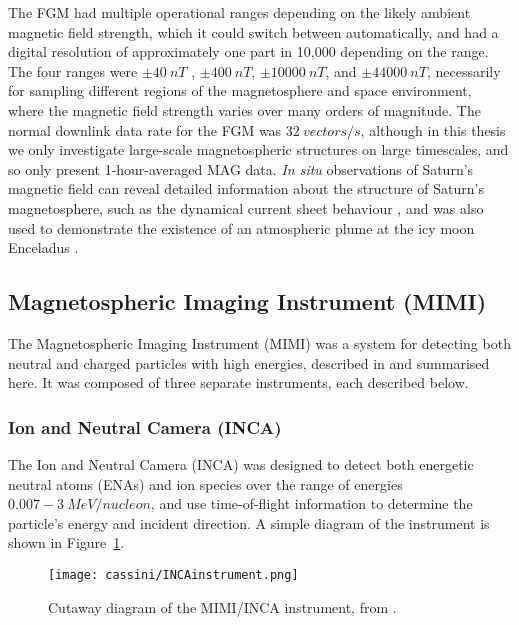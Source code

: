 The FGM had multiple operational ranges depending on the likely ambient magnetic field strength, which it could switch between automatically, and had a digital resolution of approximately one part in 10,000 depending on the range. The four ranges were $\pm\SI{40}{nT}$ , $\pm\SI{400}{nT}$, $\pm\SI{10000}{nT}$, and $\pm\SI{44000}{nT}$, necessarily for sampling different regions of the magnetosphere and space environment, where the magnetic  field strength  varies over many orders of magnitude. The normal downlink data rate for the FGM was $\SI{32}{vectors/s}$, although in this thesis we only investigate large-scale magnetospheric structures on large timescales, and so only present 1-hour-averaged MAG data. \textit{In situ} observations of Saturn's magnetic field can reveal detailed information about the structure of Saturn's magnetosphere, such as the dynamical current sheet behaviour \citep[e.g.][]{provan2012}, and was also used to demonstrate the existence of an atmospheric plume at the icy moon Enceladus \citep{dougherty2006}.

\subsection{Magnetospheric Imaging Instrument (MIMI)}
The Magnetospheric Imaging Instrument (MIMI) was a system for detecting both neutral and charged particles with high energies, described in \citet{krimigis2004} and summarised here. It was composed of three separate instruments, each described below.
\subsubsection{Ion and Neutral Camera (INCA)}
The Ion and Neutral Camera (INCA) was designed to detect both energetic neutral atoms (ENAs) and ion species over the range of energies $0.007-\SI{3}{MeV/nucleon}$, and use time-of-flight information to determine the particle's energy and incident direction. A simple diagram of the instrument is shown in Figure~\ref{cassini:fig:INCAinstrument}.

\begin{figure}
\centering
\noindent\texttt{[image: cassini/INCAinstrument.png]}
\caption[Diagram of the MIMI/INCA instrument.]{Cutaway diagram of the MIMI/INCA instrument, from \citet{krimigis2004}.}
\label{cassini:fig:INCAinstrument}
\end{figure}

